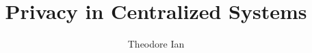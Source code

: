 \documentclass[defaultstyle,11pt]{thesis}
\title{Privacy in Centralized Systems}
\author{Theodore Ian}{Martiny}
\begin{document}





% 

\nocite{*}		%

\appendix





\end{document}
